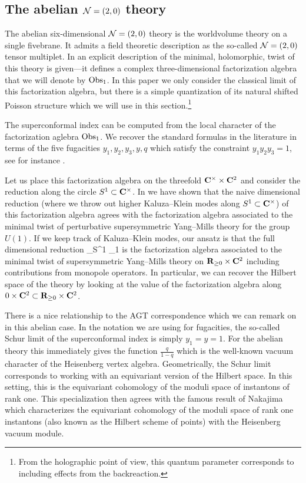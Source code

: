 \documentclass[11pt]{amsart}
\begin{document}
\subsection*{The abelian $\mathcal N=(2,0)$ theory}

The abelian six-dimensional $\mathcal N=(2,0)$ theory is the worldvolume theory on a single fivebrane. 
It admits a field theoretic description as the so-called $\mathcal N=(2,0)$ tensor multiplet. 
In \cite{SWtensor} an explicit description of the minimal, holomorphic, twist of this theory is given---it defines a complex three-dimensional factorization algebra that we will denote by $\operatorname{Obs}_1$.
In this paper we only consider the classical limit of this factorization algebra, but there is a simple quantization of its natural shifted Poisson structure which we will use in this section.\footnote{From the holographic point of view, this quantum parameter corresponds to including effects from the backreaction.}

The superconformal index can be computed from the local character of the factorization aglebra $\operatorname{Obs}_1$. 
We recover the standard formulas in the literature in terms of the five fugacities $y_1,y_2,y_3,y,q$ which satisfy the constraint $y_1 y_2 y_3 = 1$, see for instance \cite{Kim:2013nva}.

Let us place this factorization algebra on the threefold $\mathbf{C}^\times \times \mathbf{C}^2$ and consider the reduction along the circle $S^1 \subset \mathbf{C}^\times$. 
In \cite{SWtensor} we have shown that the naive dimensional reduction (where we throw out higher Kaluza--Klein modes along $S^1 \subset \mathbf{C}^\times$) of this factorization algebra agrees with the factorization algebra associated to the minimal twist of perturbative supersymmetric Yang--Mills theory for the group $U(1)$. 
If we keep track of Kaluza--Klein modes, our ansatz is that the full dimensional reduction 
\beqn
\oint_{S^1} \Obs_1
\eeqn
is the factorization algebra associated to the minimal twist of supersymmetric Yang--Mills theory on $\mathbf{R}_{\geq 0} \times \mathbf{C}^2$ including contributions from monopole operators.
In particular, we can recover the Hilbert space of the theory by looking at the value of the factorization algebra along $0 \times \mathbf{C}^2 \subset \mathbf{R}_{\geq 0} \times \mathbf{C}^2$.

There is a nice relationship to the AGT correspondence which we can remark on in this abelian case. 
In the notation we are using for fugacities, the so-called Schur limit of the superconformal index is simply $y_1=y=1$.
For the abelian theory this immediately gives the function $\frac{q}{1-q}$ which is the well-known vacuum character of the Heisenberg vertex algebra. 
Geometrically, the Schur limit corresponds to working with an equivariant version of the Hilbert space.
In this setting, this is the equivariant cohomology of the moduli space of instantons of rank one.
This specialization then agrees with the famous result of Nakajima which characterizes the equivariant cohomology of the moduli space of rank one instantons (also known as the Hilbert scheme of points) with the Heisenberg vacuum module.
\end{document}
